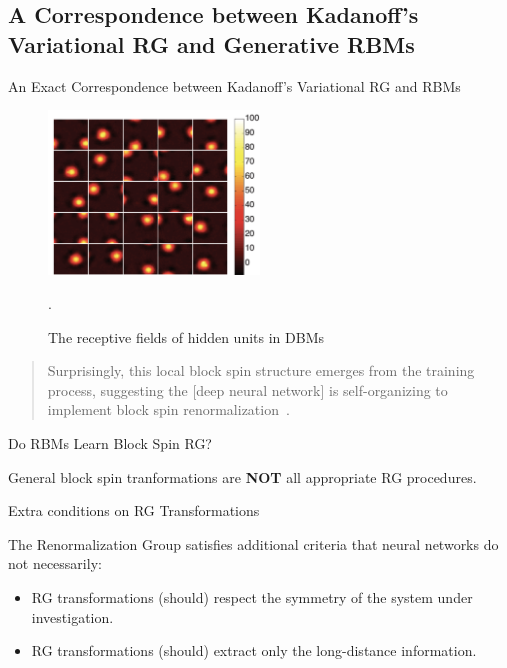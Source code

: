 \documentclass{beamer}
\begin{document}
\subsection{A Correspondence between Kadanoff's Variational RG and
  Generative RBMs}
\begin{frame}{An Exact Correspondence between Kadanoff's Variational
    RG and RBMs}

  \begin{figure}[ht]
    \centering
    \includegraphics[width=0.5\textwidth]{figures/mehta.png}
    \caption{ The receptive fields of hidden units in
      DBMs~\cite{mehta}}.%
  \end{figure}%
  \begin{quote} Surprisingly, this local block spin structure emerges
    from the training process, suggesting the [deep neural network] is
    self-organizing to implement block spin
    renormalization~\cite{mehta}.
  \end{quote}
\end{frame}
%

\begin{frame}{Do RBMs Learn Block Spin RG?}

  {\huge General block spin tranformations are \textbf{NOT} all
    appropriate RG procedures.  }
\end{frame}

\begin{frame}{Extra conditions on RG Transformations}

  {\Large The Renormalization Group satisfies additional criteria that
    neural networks do not necessarily:}
  \begin{itemize}
  \item RG transformations (should) respect the symmetry of the system
    under investigation.
  \item RG transformations (should) extract only the long-distance
    information.
  \end{itemize}
\end{frame}
\end{document}
